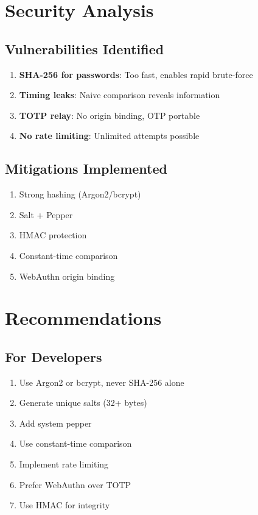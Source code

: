 \documentclass[12pt,a4paper]{article}
\begin{document}
\section{Security Analysis}

\subsection{Vulnerabilities Identified}
\begin{enumerate}
\item \textbf{SHA-256 for passwords}: Too fast, enables rapid brute-force
\item \textbf{Timing leaks}: Naive comparison reveals information
\item \textbf{TOTP relay}: No origin binding, OTP portable
\item \textbf{No rate limiting}: Unlimited attempts possible
\end{enumerate}

\subsection{Mitigations Implemented}
\begin{enumerate}
\item Strong hashing (Argon2/bcrypt)
\item Salt + Pepper
\item HMAC protection
\item Constant-time comparison
\item WebAuthn origin binding
\end{enumerate}

\section{Recommendations}

\subsection{For Developers}
\begin{enumerate}
\item Use Argon2 or bcrypt, never SHA-256 alone
\item Generate unique salts (32+ bytes)
\item Add system pepper
\item Use constant-time comparison
\item Implement rate limiting
\item Prefer WebAuthn over TOTP
\item Use HMAC for integrity
\end{enumerate}
\end{document}
